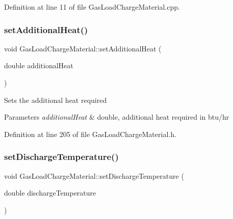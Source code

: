 Definition at line 11 of file Gas\+Load\+Charge\+Material.\+cpp.

\mbox{\label{class_gas_load_charge_material_a08ef5196ea9919dfc71be6744c7da08e}} 
\subsubsection{\texorpdfstring{set\+Additional\+Heat()}{setAdditionalHeat()}}
{\footnotesize\ttfamily void Gas\+Load\+Charge\+Material\+::set\+Additional\+Heat (\begin{DoxyParamCaption}\item[{double}]{additional\+Heat }\end{DoxyParamCaption})\hspace{0.3cm}{\ttfamily [inline]}}

Sets the additional heat required 
\begin{DoxyParams}{Parameters}
{\em additional\+Heat} & double, additional heat required in btu/hr \\
\hline
\end{DoxyParams}


Definition at line 205 of file Gas\+Load\+Charge\+Material.\+h.

\mbox{\label{class_gas_load_charge_material_a6c53344d5370a1e9b7321a530a6843c0}} 
\subsubsection{\texorpdfstring{set\+Discharge\+Temperature()}{setDischargeTemperature()}}
{\footnotesize\ttfamily void Gas\+Load\+Charge\+Material\+::set\+Discharge\+Temperature (\begin{DoxyParamCaption}\item[{double}]{discharge\+Temperature }\end{DoxyParamCaption})\hspace{0.3cm}{\ttfamily [inline]}}

